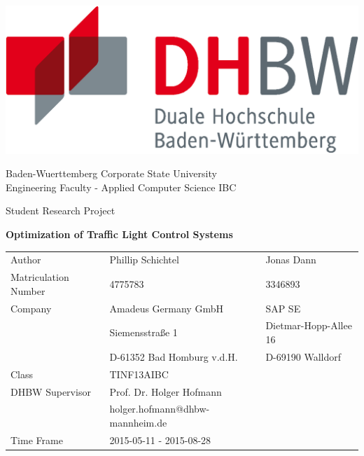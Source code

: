 \thispagestyle{empty}

\includegraphics[scale=0.3]{resources/dhbw_logo.eps} \\

\begin{center}

\vspace{0.5cm}

{\large Baden-Wuerttemberg Corporate State University}\\
{\large Engineering Faculty - Applied Computer Science IBC}\\

\vspace{0.5cm}

{\large Student Research Project}\\

\vspace{1cm}

{\large \textbf{Optimization of Traffic Light Control Systems}}

\vspace{1.5cm}

\begin{tabular}{lll}
Author				& Phillip Schichtel & Jonas Dann \\
Matriculation Number& 4775783 & 3346893 \\
Company				& Amadeus Germany GmbH & SAP SE \\
					& Siemensstraße 1 & Dietmar-Hopp-Allee 16 \\
					& D-61352 Bad Homburg v.d.H. & D-69190 Walldorf \\
Class				& TINF13AIBC & \\
DHBW Supervisor	    & Prof. Dr. Holger Hofmann & \\
					& holger.hofmann@dhbw-mannheim.de & \\
Time Frame			& 2015-05-11 - 2015-08-28 & \\
\end{tabular}

\vspace{0.5cm}
\vspace{0.5cm}

\end{center}

\newpage